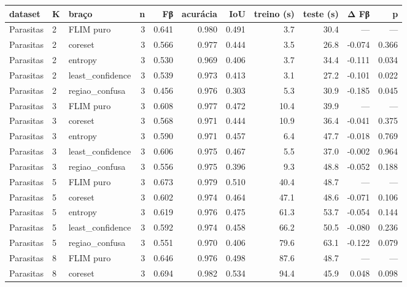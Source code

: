 \begin{tabular}{lllrrrrrrrr}
\hline
dataset & K & braço & n & Fβ & acurácia & IoU & treino (s) & teste (s) & Δ Fβ & p \\
\hline
Parasitas & 2 & FLIM puro & 3 & 0.641 & 0.980 & 0.491 & 3.7 & 30.4 & — & — \\
Parasitas & 2 & coreset & 3 & 0.566 & 0.977 & 0.444 & 3.5 & 26.8 & -0.074 & 0.366 \\
Parasitas & 2 & entropy & 3 & 0.530 & 0.969 & 0.406 & 3.7 & 34.4 & -0.111 & 0.034 \\
Parasitas & 2 & least\_confidence & 3 & 0.539 & 0.973 & 0.413 & 3.1 & 27.2 & -0.101 & 0.022 \\
Parasitas & 2 & regiao\_confusa & 3 & 0.456 & 0.976 & 0.303 & 5.3 & 30.9 & -0.185 & 0.045 \\
Parasitas & 3 & FLIM puro & 3 & 0.608 & 0.977 & 0.472 & 10.4 & 39.9 & — & — \\
Parasitas & 3 & coreset & 3 & 0.568 & 0.971 & 0.444 & 10.9 & 36.4 & -0.041 & 0.375 \\
Parasitas & 3 & entropy & 3 & 0.590 & 0.971 & 0.457 & 6.4 & 47.7 & -0.018 & 0.769 \\
Parasitas & 3 & least\_confidence & 3 & 0.606 & 0.975 & 0.467 & 5.5 & 37.0 & -0.002 & 0.964 \\
Parasitas & 3 & regiao\_confusa & 3 & 0.556 & 0.975 & 0.396 & 9.3 & 48.8 & -0.052 & 0.188 \\
Parasitas & 5 & FLIM puro & 3 & 0.673 & 0.979 & 0.510 & 40.4 & 48.7 & — & — \\
Parasitas & 5 & coreset & 3 & 0.602 & 0.974 & 0.464 & 47.1 & 48.6 & -0.071 & 0.106 \\
Parasitas & 5 & entropy & 3 & 0.619 & 0.976 & 0.475 & 61.3 & 53.7 & -0.054 & 0.144 \\
Parasitas & 5 & least\_confidence & 3 & 0.592 & 0.974 & 0.458 & 66.2 & 50.5 & -0.080 & 0.236 \\
Parasitas & 5 & regiao\_confusa & 3 & 0.551 & 0.970 & 0.406 & 79.6 & 63.1 & -0.122 & 0.079 \\
Parasitas & 8 & FLIM puro & 3 & 0.646 & 0.976 & 0.498 & 87.6 & 48.7 & — & — \\
Parasitas & 8 & coreset & 3 & 0.694 & 0.982 & 0.534 & 94.4 & 45.9 & 0.048 & 0.098 \\

\end{tabular}
